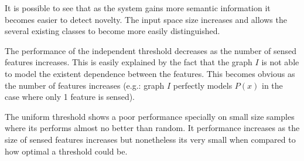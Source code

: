 It is possible to see that as the system gains more semantic information it
becomes easier to detect novelty. The input space size increases and allows the
several existing classes to become more easily distinguished.

The performance of the independent threshold decreases as the number of sensed
features increases. This is easily explained by the fact that the graph $I$ is not
able to model the existent dependence between the features. This becomes obvious
as the number of features increases (e.g.: graph $I$ perfectly models $P(x)$ in the
case where only 1 feature is sensed).

The uniform threshold shows a poor performance specially on small size samples
where its performs almost no better than random.
It performance increases as the size of sensed features increases but nonetheless
its very small when compared to how optimal a threshold could be.



